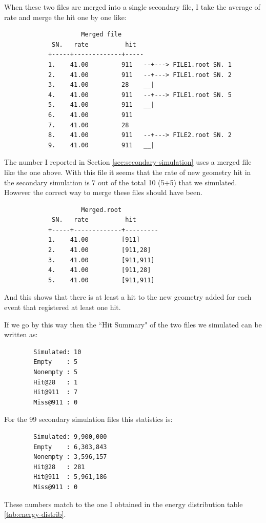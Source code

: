 \documentclass[a4paper,12pt]{article}
\begin{document}
    When these two files are merged into a single secondary file, I take the average of rate and merge the hit one by one like:
        \begin{verbatim}
                     Merged file
             SN.   rate          hit
            +-----+-------------+-----
            1.    41.00         911   --+---> FILE1.root SN. 1
            2.    41.00         911   --+---> FILE1.root SN. 2
            3.    41.00         28    __|
            4.    41.00         911   --+---> FILE1.root SN. 5
            5.    41.00         911   __|
            6.    41.00         911
            7.    41.00         28
            8.    41.00         911   --+---> FILE2.root SN. 2
            9.    41.00         911   __|
        \end{verbatim}

    The number I reported in Section \ref{sec:secondary-simulation} uses a merged file like the one above. With this file it seems that the rate of new geometry hit in the secondary simulation is 7 out of the total 10 (5+5) that we simulated. However the correct way to merge these files should have been. 

        \begin{verbatim}
                     Merged.root           
             SN.   rate          hit       
            +-----+-------------+--------- 
            1.    41.00         [911]      
            2.    41.00         [911,28]   
            3.    41.00         [911,911]  
            4.    41.00         [911,28]
            5.    41.00         [911,911]
        \end{verbatim}

   And this shows that there is at least a hit to the new geometry added for each event that registered at least one hit. 

   If we go by this way then the ``Hit Summary" of the two files we simulated can be written as:
   \begin{verbatim}
        Simulated: 10
        Empty    : 5
        Nonempty : 5
        Hit@28   : 1
        Hit@911  : 7
        Miss@911 : 0
   \end{verbatim}

   For the 99 secondary simulation files this statistics is:

   \begin{verbatim}
        Simulated: 9,900,000
        Empty    : 6,303,843
        Nonempty : 3,596,157
        Hit@28   : 281
        Hit@911  : 5,961,186
        Miss@911 : 0
   \end{verbatim}

These numbers match to the one I obtained in the energy distribution table \ref{tab:energy-distrib}.


%
%
\end{document}
